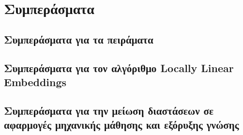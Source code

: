 

\chapter{Συμπεράσματα}

\section{Συμπεράσματα για τα πειράματα}

\section{Συμπεράσματα για τον αλγόριθμο \textlatin{Locally Linear Embeddings}}

\section{Συμπεράσματα για την μείωση διαστάσεων σε αφαρμογές μηχανικής μάθησης και εξόρυξης γνώσης}
